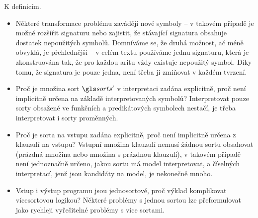 \begin{note}
K definicím.
\begin{itemize}
\item Některé transformace problému zavádějí nové symboly --
  v takovém případě je možné rozšířit signaturu nebo zajistit,
  že stávající signatura obsahuje dostatek nepoužitých symbolů. Domníváme se,
  že druhá možnost, ač méně obvyklá, je přehlednější --
  v celém textu používáme jednu signaturu, která je
  zkonstruována tak, že pro každou aritu vždy existuje
  nepoužitý symbol. Díky tomu, že signatura je pouze jedna,
  není třeba ji zmiňovat v každém tvrzení.
\item Proč je množina sort $\sorts'$ v interpretaci zadána explicitně, proč
  není implicitně určena na základě interpretovaných symbolů?
  Interpretovat pouze sorty obsažené ve funkčních a predikátových
  symbolech nestačí, je třeba interpretovat i sorty proměnných.
\item Proč je sorta na vstupu zadána explicitně, proč není implicitně určena
  z klauzulí na vstupu? Vstupní množina klauzulí nemusí žádnou sortu
  obsahovat (prázdná množina nebo množina s prázdnou klauzulí), v takovém
  případě není
  jednoznačně určeno, jakou sortu má model interpretovat, a číselných
  interpretací, jenž jsou kandidáty na model, je nekonečně mnoho.
\item Vstup i výstup programu jsou jednosortové, proč výklad komplikovat
  více\-sor\-tovou logikou? Některé problémy s jednou sortou
  lze přeformulovat jako rychleji vyřešitelné problémy s více sortami.
\end{itemize}
\end{note}
